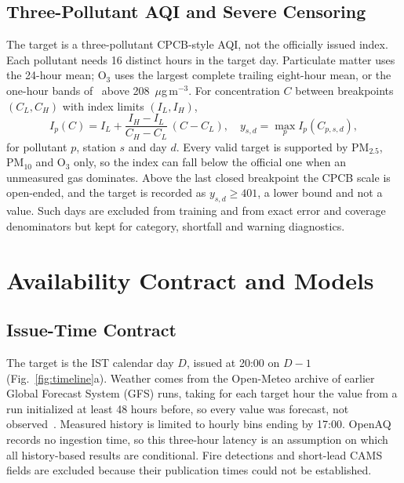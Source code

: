 \documentclass[conference,a4paper]{IEEEtran}
\newcommand{\pmtwo}{PM$_{2.5}$}
\newcommand{\pmten}{PM$_{10}$}
\newcommand{\ozone}{O$_3$}
\begin{document}
\subsection{Three-Pollutant AQI and Severe Censoring}
The target is a three-pollutant CPCB-style AQI, not the officially issued index. Each pollutant needs 16 distinct hours in the target day. Particulate matter uses the 24-hour mean; \ozone{} uses the largest complete trailing eight-hour mean, or the one-hour bands of~\cite{cpcb2014} above 208~$\mu$g\,m$^{-3}$. For concentration $C$ between breakpoints $(C_L, C_H)$ with index limits $(I_L, I_H)$,
\begin{equation}
I_p(C) = I_L + \frac{I_H - I_L}{C_H - C_L}\,(C - C_L), \quad y_{s,d} = \max_{p} I_p(C_{p,s,d}),
\label{eq:aqi}
\end{equation}
for pollutant $p$, station $s$ and day $d$. Every valid target is supported by \pmtwo{}, \pmten{} and \ozone{} only, so the index can fall below the official one when an unmeasured gas dominates. Above the last closed breakpoint the CPCB scale is open-ended, and the target is recorded as $y_{s,d} \ge 401$, a lower bound and not a value. Such days are excluded from training and from exact error and coverage denominators but kept for category, shortfall and warning diagnostics.

\section{Availability Contract and Models}
\subsection{Issue-Time Contract}
The target is the IST calendar day $D$, issued at 20:00 on $D-1$ (Fig.~\ref{fig:timeline}a). Weather comes from the Open-Meteo archive of earlier Global Forecast System (GFS) runs, taking for each target hour the value from a run initialized at least 48 hours before, so every value was forecast, not observed~\cite{openmeteo2026}. Measured history is limited to hourly bins ending by 17:00. OpenAQ records no ingestion time, so this three-hour latency is an assumption on which all history-based results are conditional. Fire detections and short-lead CAMS fields are excluded because their publication times could not be established.
\end{document}
